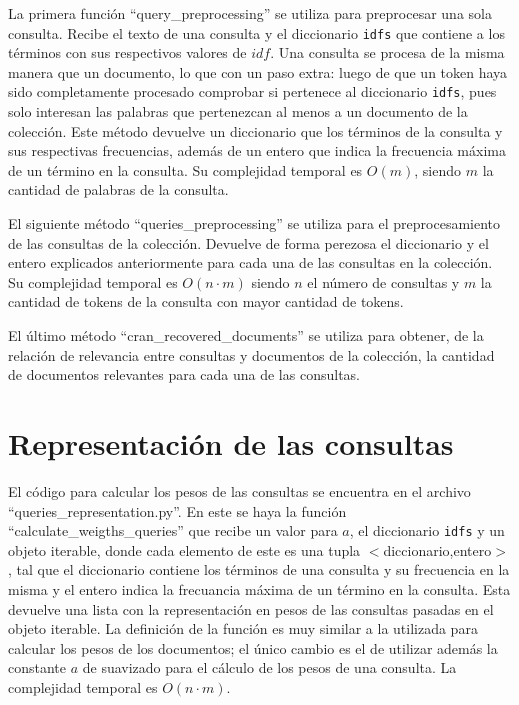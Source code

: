 \documentclass[runningheads]{llncs}
\begin{document}
	La primera funci\'on ``query\_preprocessing'' se utiliza para preprocesar una sola consulta. Recibe el texto de una consulta y el diccionario \verb|idfs| que contiene a los t\'erminos con sus respectivos valores de $idf$. Una consulta se procesa de la misma manera que un documento, lo que con un paso extra: luego de que un token haya sido completamente procesado comprobar si pertenece al diccionario \verb|idfs|, pues solo interesan las palabras que pertenezcan al menos a un documento de la colecci\'on. Este m\'etodo devuelve un diccionario que los t\'erminos de la consulta y sus respectivas frecuencias, adem\'as de un entero que indica la frecuencia m\'axima de un t\'ermino en la consulta. Su complejidad temporal es $O(m)$, siendo $m$ la cantidad de palabras de la consulta. 
	
	El siguiente m\'etodo ``queries\_preprocessing'' se utiliza para el preprocesamiento de las consultas de la colecci\'on. Devuelve de forma perezosa el diccionario y el entero explicados anteriormente para cada una de las consultas en la colecci\'on. Su complejidad temporal es $O(n\cdot m)$ siendo $n$ el n\'umero de consultas y $m$ la cantidad de tokens de la consulta con mayor cantidad de tokens.
	
	El \'ultimo m\'etodo ``cran\_recovered\_documents'' se utiliza para obtener, de la relaci\'on de relevancia entre consultas y documentos de la colecci\'on, la cantidad de documentos relevantes para cada una de las consultas.
	
	\section{Representaci\'on de las consultas}
	
	El c\'odigo para calcular los pesos de las consultas se encuentra en el archivo ``queries\_representation.py''. En este se haya la funci\'on ``calculate\_weigths\_queries'' que recibe un valor para $a$, el diccionario \verb|idfs| y un objeto iterable, donde cada elemento de este es una tupla $<$diccionario,entero$>$, tal que el diccionario contiene los t\'erminos de una consulta y su frecuencia en la misma y el entero indica la frecuancia m\'axima de un t\'ermino en la consulta. Esta devuelve una lista con la representaci\'on en pesos de las consultas pasadas en el objeto iterable. La definici\'on de la funci\'on es muy similar a la utilizada para calcular los pesos de los documentos; el \'unico cambio es el de utilizar adem\'as la constante $a$ de suavizado para el c\'alculo de los pesos de una consulta. La complejidad temporal es $O(n\cdot m)$.
	
\end{document}
